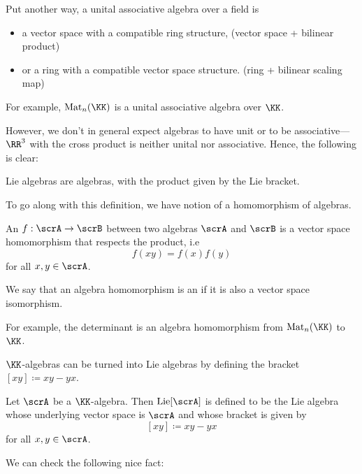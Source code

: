 \documentclass{article}
\newcommand{\lb}[1]{\ensuremath{\left[{#1}\right]}}
\DeclareMathOperator{\Mat}{Mat}
\DeclareMathOperator{\Lie}{Lie}
\begin{document}
Put another way, a unital associative algebra over a field is 
\begin{itemize}
    \item 
        a vector space with a compatible ring structure, (vector space + bilinear product)
    \item 
        or a ring with a compatible vector space structure.
        (ring + bilinear scaling map)
\end{itemize}
For example, $\Mat_n(\KK)$ is a unital associative algebra over $\KK$.

However, we don't in general expect algebras to have unit or to be associative--- $\RR^3$ with the cross product is neither unital nor associative.
Hence, the following is clear:

\begin{proposition}
    Lie algebras are algebras, with the product given by the Lie bracket.
\end{proposition}

To go along with this definition, we have notion of a homomorphism of algebras.

\begin{definition}
    An  $f: \scrA \to \scrB$ between two algebras $\scrA$ and $\scrB$ is a vector space homomorphism that respects the product, i.e
    \[
        f(xy) 
        = 
        f(x)f(y)
    \]
    for all $x, y \in \scrA$.

    We say that an algebra homomorphism is an  if it is also a vector space isomorphism.
\end{definition}

For example, the determinant is an algebra homomorphism from $\Mat_n(\KK)$ to $\KK$.

$\KK$-algebras can be turned into Lie algebras by defining the bracket $\lb{xy} \coloneq xy - yx$.

\begin{definition}
    Let $\scrA$ be a $\KK$-algebra.
    Then $\Lie[\scrA]$ is defined to be the Lie algebra whose underlying vector space is $\scrA$ and whose bracket is given by
    \[
        \lb{xy}
        \coloneq
        xy - yx
    \]
    for all $x, y \in \scrA$.
\end{definition}

We can check the following nice fact: 
\end{document}
